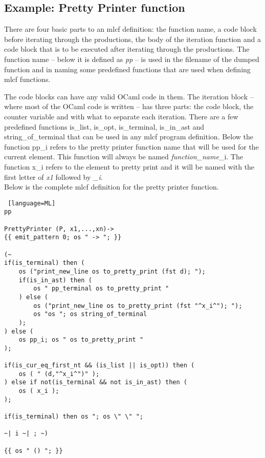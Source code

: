 \subsection{Example: Pretty Printer function}

There are four basic parts to an mlcf definition: the function name, a code block before iterating through the productions,
the body of the iteration function and a code block that is to be executed after iterating through the productions. The function
name -- below it is defined as \textit{pp} -- is used in the filename of the dumped function and in naming some predefined
functions that are used when defining mlcf functions. 

The code blocks can have any valid OCaml code in them. The iteration block --
where most of the OCaml code is written -- has three parts: the code block, the counter variable and with what to separate
each iteration. There are a few predefined functions is\_list, is\_opt, is\_terminal, is\_in\_ast and string\_of\_terminal that can 
be used in any mlcf program definition. Below the function pp\_i refers to the pretty printer function name that will be used for
the current element. This function will always be named \textit{function\_name}\_i. The function x\_i refers to the element to 
pretty print and it will be named with the first letter of \textit{x1} followed by \textit{\_i}. \\

\noindent Below is the complete mlcf definition for the pretty printer function. 
\begin{lstlisting} [language=ML]
pp

PrettyPrinter (P, x1,...,xn)-> 
{{ emit_pattern 0; os " -> "; }}

(~
if(is_terminal) then (
	os ("print_new_line os to_pretty_print (fst d); ");
	if(is_in_ast) then (
		os " pp_terminal os to_pretty_print "
	) else (
		os ("print_new_line os to_pretty_print (fst "^x_i^"); ");
		os "os "; os string_of_terminal
	);
) else (
	os pp_i; os " os to_pretty_print "
);

if(is_cur_eq_first_nt && (is_list || is_opt)) then (
	os ( " (d,"^x_i^")" );
) else if not(is_terminal && not is_in_ast) then (
	os ( x_i );
);

if(is_terminal) then os "; os \" \" ";

~| i ~| ; ~)

{{ os " () "; }}
\end{lstlisting}